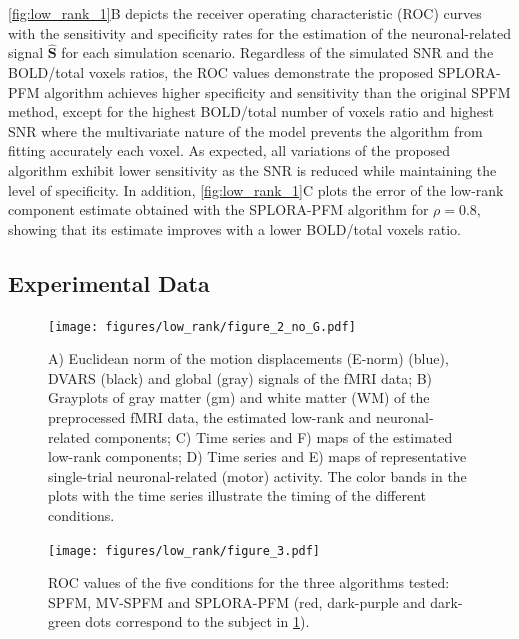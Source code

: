 \cref{fig:low_rank_1}B depicts the receiver operating characteristic (ROC)
curves with the sensitivity and specificity rates for the estimation of the
neuronal-related signal $\mathbf{\hat{S}}$ for each simulation scenario.
Regardless of the simulated SNR and the BOLD/total voxels ratios, the ROC values
demonstrate the proposed SPLORA-PFM algorithm achieves higher specificity and
sensitivity than the original SPFM method, except for the highest BOLD/total
number of voxels ratio and highest SNR where the multivariate nature of the
model prevents the algorithm from fitting accurately each voxel. As expected,
all variations of the proposed algorithm exhibit lower sensitivity as the SNR is
reduced while maintaining the level of specificity. In addition,
\cref{fig:low_rank_1}C plots the error of the low-rank component estimate
obtained with the SPLORA-PFM algorithm for $\rho = 0.8$, showing that its
estimate improves with a lower BOLD/total voxels ratio.

\subsection{Experimental Data}

\begin{figure}[th!]
    \centering
    \texttt{[image: figures/low\_rank/figure\_2\_no\_G.pdf]}
    \caption{A) Euclidean norm of the motion displacements (E-norm) (blue),
    DVARS (black) and global (gray) signals of the fMRI data; B) Grayplots of
    gray matter (\acrshort*{gm}) and white matter (WM) of the preprocessed fMRI
    data, the estimated low-rank and neuronal-related components; C) Time series
    and F) maps of the estimated low-rank components; D) Time series and E) maps
    of representative single-trial neuronal-related (motor) activity. The color
    bands in the plots with the time series illustrate the timing of the
    different conditions.}
    \label{fig:low_rank_2}
\end{figure}


\begin{figure}[th!]
    \centering
    \texttt{[image: figures/low\_rank/figure\_3.pdf]}
    \caption{ROC values of the five conditions for the three algorithms tested:
    SPFM, MV-SPFM and SPLORA-PFM (red, dark-purple and dark-green dots
    correspond to the subject in \cref{fig:low_rank_2}).}
    \label{fig:low_rank_3}
\end{figure}


